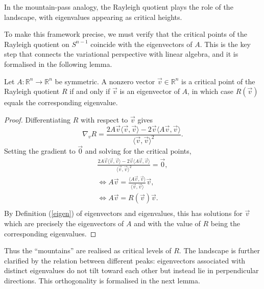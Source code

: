 \noindent In the mountain-pass analogy, the Rayleigh quotient plays the role of the landscape, with eigenvalues appearing as critical heights.

\noindent To make this framework precise, we must verify that the critical points of the Rayleigh quotient on $S^{n-1}$ coincide with the eigenvectors of $A$. This is the key step that connects the variational perspective with linear algebra, and it is formalised in the following lemma.

\begin{lemma} \label{RayleighCPs}
Let $A:\mathbb R^n \to \mathbb R^n$ be symmetric. A nonzero vector $\vec{v} \in \mathbb R^n$ is a critical point of the Rayleigh quotient $R$ if and only if $\vec{v}$ is an eigenvector of $A$, in which case $R(\vec{v})$ equals the corresponding eigenvalue.
\end{lemma}
\begin{proof}
Differentiating $R$ with respect to $\vec{v}$ gives
\begin{equation}\label{eq:RQgrad}
   \nabla_{v} R = \frac{2A\vec{v}\langle \vec{v}, \vec{v} \rangle - 2\vec{v}\langle A\vec{v}, \vec{v} \rangle}{\langle \vec{v}, \vec{v} \rangle^2}. 
\end{equation}
Setting the gradient to $\vec{0}$ and solving for the critical points,
\begin{align*}
\frac{2A\vec{v}\langle \vec{v}, \vec{v} \rangle - 2\vec{v}\langle A\vec{v}, \vec{v} \rangle}{\langle \vec{v}, \vec{v} \rangle^2} = \vec{0}, \\
\Leftrightarrow A\vec{v} = \frac{\langle A \vec{v},\vec{v}\rangle}{\langle \vec{v}, \vec{v} \rangle} \vec{v}, \\
\Leftrightarrow A\vec{v} = R(\vec{v})\vec{v}. \\
\end{align*}
By Definition (\ref{eigen}) of eigenvectors and eigenvalues, this has solutions for $\vec{v}$ which are precisely the eigenvectors of $A$ and with the value of $R$ being the corresponding eigenvalues.
\end{proof}

\noindent Thus the “mountains” are realised as critical levels of $R$. The landscape is further clarified by the relation between different peaks: eigenvectors associated with distinct eigenvalues do not tilt toward each other but instead lie in perpendicular directions. This orthogonality is formalised in the next lemma. 

